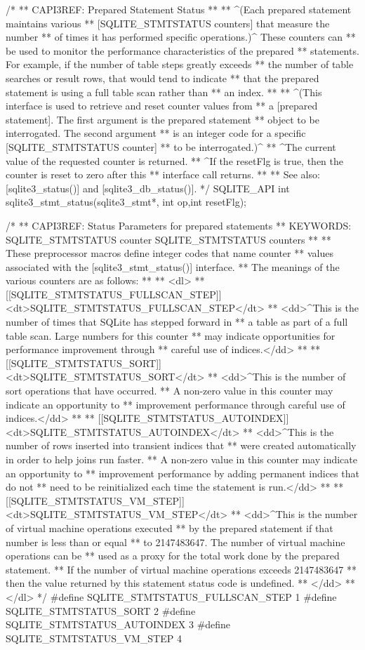 \begin{Codex}[label=sqlite3.h,numbers=left]
{/*
** CAPI3REF: Prepared Statement Status
**
** ^(Each prepared statement maintains various
** [SQLITE_STMTSTATUS counters] that measure the number
** of times it has performed specific operations.)^  These counters can
** be used to monitor the performance characteristics of the prepared
** statements.  For example, if the number of table steps greatly exceeds
** the number of table searches or result rows, that would tend to indicate
** that the prepared statement is using a full table scan rather than
** an index.  
**
** ^(This interface is used to retrieve and reset counter values from
** a [prepared statement].  The first argument is the prepared statement
** object to be interrogated.  The second argument
** is an integer code for a specific [SQLITE_STMTSTATUS counter]
** to be interrogated.)^
** ^The current value of the requested counter is returned.
** ^If the resetFlg is true, then the counter is reset to zero after this
** interface call returns.
**
** See also: [sqlite3_status()] and [sqlite3_db_status()].
*/
SQLITE_API int sqlite3_stmt_status(sqlite3_stmt*, int op,int resetFlg);

/*
** CAPI3REF: Status Parameters for prepared statements
** KEYWORDS: {SQLITE_STMTSTATUS counter} {SQLITE_STMTSTATUS counters}
**
** These preprocessor macros define integer codes that name counter
** values associated with the [sqlite3_stmt_status()] interface.
** The meanings of the various counters are as follows:
**
** <dl>
** [[SQLITE_STMTSTATUS_FULLSCAN_STEP]] <dt>SQLITE_STMTSTATUS_FULLSCAN_STEP</dt>
** <dd>^This is the number of times that SQLite has stepped forward in
** a table as part of a full table scan.  Large numbers for this counter
** may indicate opportunities for performance improvement through 
** careful use of indices.</dd>
**
** [[SQLITE_STMTSTATUS_SORT]] <dt>SQLITE_STMTSTATUS_SORT</dt>
** <dd>^This is the number of sort operations that have occurred.
** A non-zero value in this counter may indicate an opportunity to
** improvement performance through careful use of indices.</dd>
**
** [[SQLITE_STMTSTATUS_AUTOINDEX]] <dt>SQLITE_STMTSTATUS_AUTOINDEX</dt>
** <dd>^This is the number of rows inserted into transient indices that
** were created automatically in order to help joins run faster.
** A non-zero value in this counter may indicate an opportunity to
** improvement performance by adding permanent indices that do not
** need to be reinitialized each time the statement is run.</dd>
**
** [[SQLITE_STMTSTATUS_VM_STEP]] <dt>SQLITE_STMTSTATUS_VM_STEP</dt>
** <dd>^This is the number of virtual machine operations executed
** by the prepared statement if that number is less than or equal
** to 2147483647.  The number of virtual machine operations can be 
** used as a proxy for the total work done by the prepared statement.
** If the number of virtual machine operations exceeds 2147483647
** then the value returned by this statement status code is undefined.
** </dd>
** </dl>
*/
#define SQLITE_STMTSTATUS_FULLSCAN_STEP     1
#define SQLITE_STMTSTATUS_SORT              2
#define SQLITE_STMTSTATUS_AUTOINDEX         3
#define SQLITE_STMTSTATUS_VM_STEP           4

}
\end{Codex}

